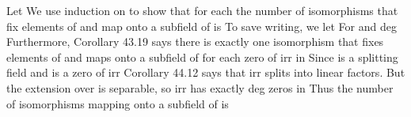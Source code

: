\documentclass[11pt,oneside]{article}
\begin{document}
\begin{BookBody}
 Let  We use induction on  to show that for each  the number of isomorphisms that fix elements of  and map  onto a subfield of  is  To save writing, we let  For  and \BookInline{[E_{1}:F]= } deg Furthermore, Corollary 43.19 says there is exactly one isomorphism that fixes elements of  and maps  onto a subfield of  for each zero of irr in  Since  is a splitting field and  is a zero of irr Corollary 44.12 says that irr splits into linear factors. But the extension  over  
is separable, so irr has exactly deg zeros in  Thus the number of isomorphisms mapping  onto a subfield of  is

\end{BookBody}

\BookNarrativetrue
\end{document}
